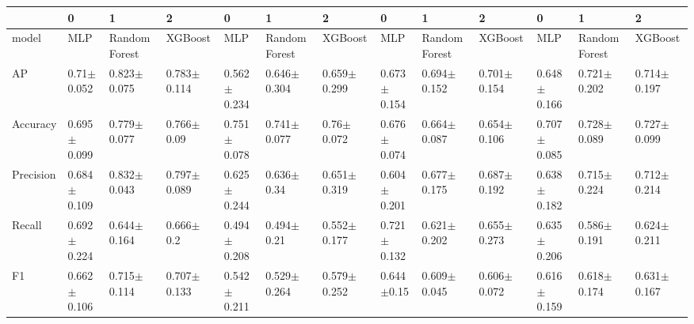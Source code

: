 \begin{tabular}{lllllllllllll}
\toprule
 & 0 & 1 & 2 & 0 & 1 & 2 & 0 & 1 & 2 & 0 & 1 & 2 \\
\midrule
model & MLP & Random Forest & XGBoost & MLP & Random Forest & XGBoost & MLP & Random Forest & XGBoost & MLP & Random Forest & XGBoost \\
AP & 0.71$\pm$0.052 & 0.823$\pm$0.075 & 0.783$\pm$0.114 & 0.562$\pm$0.234 & 0.646$\pm$0.304 & 0.659$\pm$0.299 & 0.673$\pm$0.154 & 0.694$\pm$0.152 & 0.701$\pm$0.154 & 0.648$\pm$0.166 & 0.721$\pm$0.202 & 0.714$\pm$0.197 \\
Accuracy & 0.695$\pm$0.099 & 0.779$\pm$0.077 & 0.766$\pm$0.09 & 0.751$\pm$0.078 & 0.741$\pm$0.077 & 0.76$\pm$0.072 & 0.676$\pm$0.074 & 0.664$\pm$0.087 & 0.654$\pm$0.106 & 0.707$\pm$0.085 & 0.728$\pm$0.089 & 0.727$\pm$0.099 \\
Precision & 0.684$\pm$0.109 & 0.832$\pm$0.043 & 0.797$\pm$0.089 & 0.625$\pm$0.244 & 0.636$\pm$0.34 & 0.651$\pm$0.319 & 0.604$\pm$0.201 & 0.677$\pm$0.175 & 0.687$\pm$0.192 & 0.638$\pm$0.182 & 0.715$\pm$0.224 & 0.712$\pm$0.214 \\
Recall & 0.692$\pm$0.224 & 0.644$\pm$0.164 & 0.666$\pm$0.2 & 0.494$\pm$0.208 & 0.494$\pm$0.21 & 0.552$\pm$0.177 & 0.721$\pm$0.132 & 0.621$\pm$0.202 & 0.655$\pm$0.273 & 0.635$\pm$0.206 & 0.586$\pm$0.191 & 0.624$\pm$0.211 \\
F1 & 0.662$\pm$0.106 & 0.715$\pm$0.114 & 0.707$\pm$0.133 & 0.542$\pm$0.211 & 0.529$\pm$0.264 & 0.579$\pm$0.252 & 0.644$\pm$0.15 & 0.609$\pm$0.045 & 0.606$\pm$0.072 & 0.616$\pm$0.159 & 0.618$\pm$0.174 & 0.631$\pm$0.167 \\
\bottomrule
\end{tabular}
